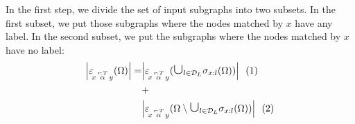 \vspace{1em}
In the first step, we divide the set of input subgraphs into two subsets.
In the first subset, we put those subgraphs where the nodes matched by $x$
have any label. In the second subset, we put the subgraphs where the nodes
matched by $x$ have no label:
\begin{align}
\begin{split}
  \card{\expandvar{x}{r:T}{\alpha}{y}(\Omega)}
               = &\card{\expandvar{x}{r:T}{\alpha}{y}(
                    \bigunion_{l \in \nlabels} \selection{x:l}(\Omega))}
                      ~~\text{(1)} \\
                   &+ \\
                   &\card{\expandvar{x}{r:T}{\alpha}{y}(
                     \Omega \setminus
                       \bigunion_{l \in \nlabels} \selection{x:l}(\Omega))}
                         ~~\text{(2)}
\end{split}
\end{align}

